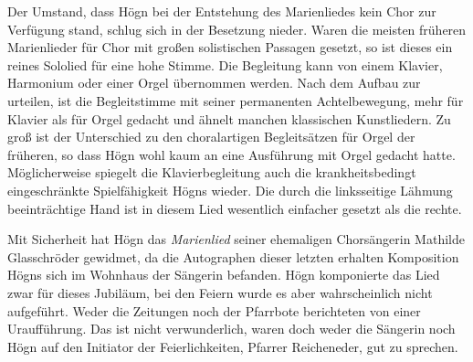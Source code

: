 \documentclass{book}
\begin{document}














Der Umstand, dass Högn bei der Entstehung des Marienliedes kein Chor zur
Verfügung stand, schlug sich in der Besetzung nieder. Waren die meisten
früheren Marienlieder für Chor mit großen solistischen Passagen
gesetzt, so ist dieses ein reines Sololied für eine hohe Stimme. Die
Begleitung kann von einem Klavier, Harmonium oder einer Orgel
übernommen werden. Nach dem Aufbau zur urteilen, ist die Begleitstimme
mit seiner permanenten Achtelbe\-wegung, mehr für Klavier als für Orgel
gedacht und ähnelt manchen klassi\-schen Kunstliedern. Zu groß ist der
Unterschied zu den choralartigen Begleit\-sätzen für Orgel der
früheren, so dass Högn wohl kaum an eine Ausführung mit Orgel gedacht
hatte. Möglicherweise spiegelt die Klavierbegleitung auch die
krankheitsbedingt eingeschränkte Spielfähigkeit Högns wieder. Die durch
die linksseitige Lähmung beeinträchtige Hand ist in diesem Lied
wesentlich ein\-facher gesetzt als die rechte.


Mit Sicherheit hat Högn das \textit{Marienlied }seiner ehemaligen
Chorsängerin Mathilde Glasschröder gewidmet, da die Autographen dieser
letzten erhalten Komposition Högns sich im Wohnhaus der Sängerin
befanden. Högn kom\-ponierte das Lied zwar für dieses Jubiläum, bei den
Feiern wurde es aber wahrscheinlich nicht aufgeführt. Weder die
Zeitungen noch der Pfarrbote be\-richteten von einer Uraufführung. Das
ist nicht verwunderlich, waren doch weder die Sängerin noch Högn auf
den Initiator der Feierlichkeiten, Pfarrer Reicheneder, gut zu
sprechen.
\end{document}
